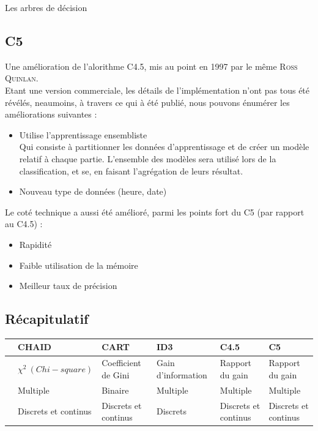 \documentclass[a4paper, 11pt]{report}
\begin{document}
\begin{chapter}{Les arbres de décision}

\newpage
\subsection{C5} 
Une amélioration de l'alorithme C4.5, mis au point en 1997 par le même \textsc{Ross Quinlan}. \\Etant une version commerciale, les détails de l'implémentation n'ont pas tous été révélés, neaumoins, à travers ce qui à été publié, nous pouvons énumérer les améliorations suivantes\cite{wu2008top} :\\
\begin{itemize}
\item Utilise l'apprentissage ensembliste\\
Qui consiste à partitionner les données d'apprentissage et de créer un modèle relatif à chaque partie. L'ensemble des modèles sera utilisé lors de la classification, et se, en faisant l'agrégation de leurs résultat.
\item Nouveau type de données (heure, date)
\end{itemize}
Le coté technique a aussi été amélioré, parmi les points fort du C5 (par rapport au C4.5)\cite{pandya2015c5} : 
\begin{itemize}
\item Rapidité
\item Faible utilisation de la mémoire
\item Meilleur taux de précision
\end{itemize}
\newpage
\subsection{Récapitulatif}
\begin{table}[h!]
\begin{center}
\begin{tabular}{|c|L{2cm}|L{2cm}|L{2cm}|L{2cm}|L{2cm}|}
\hline
{} &CHAID&CART&ID3&C4.5&C5\\
 \hline
{}
 &
$\chi^2\ (Chi-square)$
 &
Coefficient de Gini
 &
Gain d'information
 &
Rapport du gain
 &
Rapport du gain
  \\
  \hline
  
 &
Multiple
 &
Binaire
 &
Multiple
 &
Multiple   
 &
Multiple 
  \\
    \hline

  
 &
Discrets et continus
 &
Discrets et continus
 &
Discrets
 &
Discrets et continus
 &
Discrets et continus
  \\
    \hline


\end{tabular}
\end{center}
\end{table}
\end{chapter}
\end{document}
